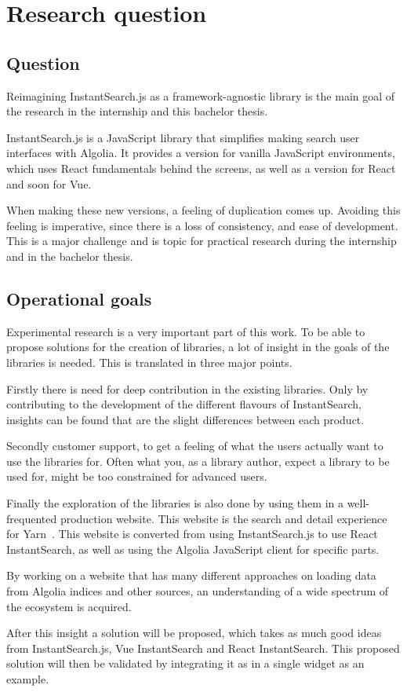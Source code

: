 
\chapter{Research question} %
\label{chp:research_question}
\section{Question}
\label{sec:question}

Reimagining InstantSearch.js as a framework-agnostic library is the main goal of the research in the internship and this bachelor thesis.

InstantSearch.js is a JavaScript library that simplifies making search user interfaces with Algolia. It provides a version for vanilla JavaScript environments, which uses React fundamentals behind the screens, as well as a version for React and soon for Vue.

When making these new versions, a feeling of duplication comes up. Avoiding this feeling is imperative, since there is a loss of consistency, and ease of development. This is a major challenge and is topic for practical research during the internship and in the bachelor thesis.

\section{Operational goals}
\label{sec:operational_goals}

Experimental research is a very important part of this work. To be able to propose solutions for the creation of libraries, a lot of insight in the goals of the libraries is needed. This is translated in three major points. 

Firstly there is need for deep contribution in the existing libraries. Only by contributing to the development of the different flavours of InstantSearch, insights can be found that are the slight differences between each product.

Secondly customer support, to get a feeling of what the users actually want to use the libraries for. Often what you, as a library author, expect a library to be used for, might be too constrained for advanced users.

Finally the exploration of the libraries is also done by using them in a well-frequented production website. This website is the search and detail experience for Yarn\cite{yarn-site}~. This website is converted from using InstantSearch.js to use React InstantSearch, as well as using the Algolia JavaScript client for specific parts.

By working on a website that has many different approaches on loading data from Algolia indices and other sources, an understanding of a wide spectrum of the ecosystem is acquired.

After this insight a solution will be proposed, which takes as much good ideas from InstantSearch.js, Vue InstantSearch and React InstantSearch. This proposed solution will then be validated by integrating it as in a single widget as an example.
